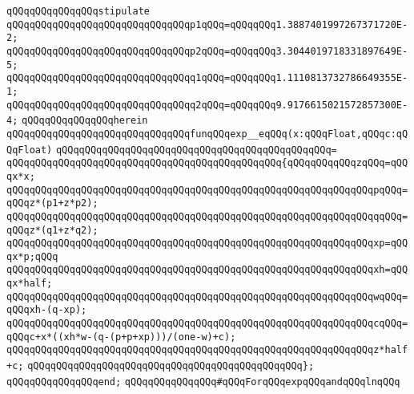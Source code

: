 \newline
\newline
\verb|qQQqqQQqqQQqqQQqstipulate|\newline
\newline
\verb|qQQqqQQqqQQqqQQqqQQqqQQqqQQqqQQqp1qQQq=qQQqqQQq1.3887401997267371720E-2;|\newline
\verb|qQQqqQQqqQQqqQQqqQQqqQQqqQQqqQQqp2qQQq=qQQqqQQq3.3044019718331897649E-5;|\newline
\verb|qQQqqQQqqQQqqQQqqQQqqQQqqQQqqQQqq1qQQq=qQQqqQQq1.1110813732786649355E-1;|\newline
\verb|qQQqqQQqqQQqqQQqqQQqqQQqqQQqqQQqq2qQQq=qQQqqQQq9.9176615021572857300E-4;|\newline
\newline
\verb|qQQqqQQqqQQqqQQqherein|\newline
\newline
\verb|qQQqqQQqqQQqqQQqqQQqqQQqqQQqqQQqfunqQQqexp__eqQQq(x:qQQqFloat,qQQqc:qQQqFloat)|\newline
\verb|qQQqqQQqqQQqqQQqqQQqqQQqqQQqqQQqqQQqqQQqqQQqqQQq=|\newline
\verb|qQQqqQQqqQQqqQQqqQQqqQQqqQQqqQQqqQQqqQQqqQQqqQQq{qQQqqQQqqQQqzqQQq=qQQqx*x;|\newline
\verb|qQQqqQQqqQQqqQQqqQQqqQQqqQQqqQQqqQQqqQQqqQQqqQQqqQQqqQQqqQQqqQQqpqQQq=qQQqz*(p1+z*p2);|\newline
\verb|qQQqqQQqqQQqqQQqqQQqqQQqqQQqqQQqqQQqqQQqqQQqqQQqqQQqqQQqqQQqqQQqqqQQq=qQQqz*(q1+z*q2);|\newline
\verb|qQQqqQQqqQQqqQQqqQQqqQQqqQQqqQQqqQQqqQQqqQQqqQQqqQQqqQQqqQQqqQQqxp=qQQqx*p;qQQq|\newline
\verb|qQQqqQQqqQQqqQQqqQQqqQQqqQQqqQQqqQQqqQQqqQQqqQQqqQQqqQQqqQQqqQQqxh=qQQqx*half;|\newline
\verb|qQQqqQQqqQQqqQQqqQQqqQQqqQQqqQQqqQQqqQQqqQQqqQQqqQQqqQQqqQQqqQQqwqQQq=qQQqxh-(q-xp);|\newline
\verb|qQQqqQQqqQQqqQQqqQQqqQQqqQQqqQQqqQQqqQQqqQQqqQQqqQQqqQQqqQQqqQQqcqQQq=qQQqc+x*((xh*w-(q-(p+p+xp)))/(one-w)+c);|\newline
\verb|qQQqqQQqqQQqqQQqqQQqqQQqqQQqqQQqqQQqqQQqqQQqqQQqqQQqqQQqqQQqqQQqz*half+c;|\newline
\verb|qQQqqQQqqQQqqQQqqQQqqQQqqQQqqQQqqQQqqQQqqQQqqQQq};|\newline
\verb|qQQqqQQqqQQqqQQqend;|\newline
\newline
\verb|qQQqqQQqqQQqqQQq#qQQqForqQQqexpqQQqandqQQqlnqQQq|\newline
